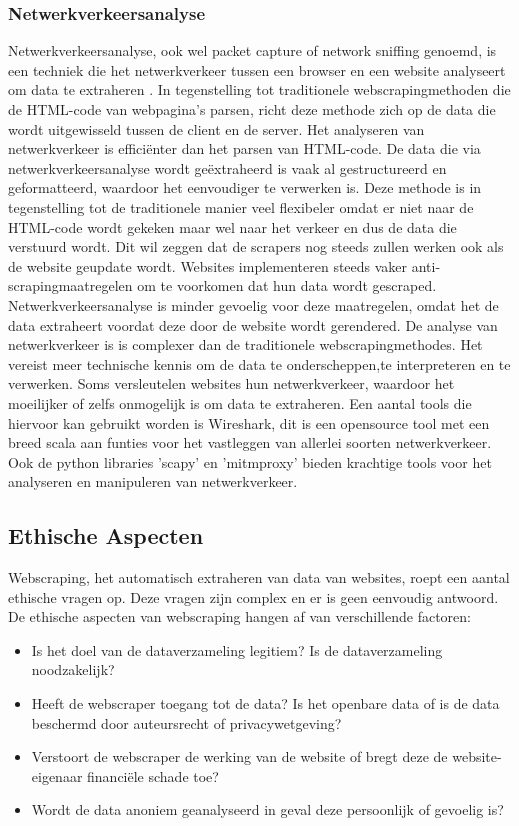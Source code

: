 \subsubsection{Netwerkverkeersanalyse}
\label{sec:Netwerkverkeersanalyse}
Netwerkverkeersanalyse, ook wel packet capture of network sniffing genoemd, is een techniek die het netwerkverkeer tussen een browser en een website analyseert om data te extraheren \autocite{Robles2020}. 
In tegenstelling tot traditionele webscrapingmethoden die de HTML-code van webpagina's parsen, richt deze methode zich op de data die wordt uitgewisseld tussen de client en de server.
Het analyseren van netwerkverkeer is efficiënter dan het parsen van HTML-code. De data die via netwerkverkeersanalyse wordt geëxtraheerd is vaak al gestructureerd en geformatteerd, 
waardoor het eenvoudiger te verwerken is. Deze methode is in tegenstelling tot de traditionele manier veel flexibeler omdat er niet naar de HTML-code wordt gekeken maar wel naar het verkeer
en dus de data die verstuurd wordt. Dit wil zeggen dat de scrapers nog steeds zullen werken ook als de website geupdate wordt. Websites implementeren steeds vaker anti-scrapingmaatregelen om 
te voorkomen dat hun data wordt gescraped. Netwerkverkeersanalyse is minder gevoelig voor deze maatregelen, omdat het de data extraheert voordat deze door de website wordt gerendered.
De analyse van netwerkverkeer is is complexer dan de traditionele webscrapingmethodes. Het vereist meer technische kennis om de data te onderscheppen,te interpreteren en te verwerken. Soms 
versleutelen websites hun netwerkverkeer, waardoor het moeilijker of zelfs onmogelijk is om data te extraheren. Een aantal tools die hiervoor kan gebruikt worden is Wireshark, dit is een
opensource tool met een breed scala aan funties voor het vastleggen van allerlei soorten netwerkverkeer. Ook de python libraries 'scapy' en 'mitmproxy' bieden krachtige tools voor het analyseren
en manipuleren van netwerkverkeer.

\subsection{Ethische Aspecten}
\label{sec:Ethische Aspecten}
Webscraping, het automatisch extraheren van data van websites, roept een aantal ethische vragen op. Deze vragen zijn complex en er is geen eenvoudig antwoord. De ethische aspecten van webscraping
hangen af van verschillende factoren:

\begin{itemize}
  \item Is het doel van de dataverzameling legitiem? Is de dataverzameling noodzakelijk?
  \item Heeft de webscraper toegang tot de data? Is het openbare data of is de data beschermd door auteursrecht of privacywetgeving?
  \item Verstoort de webscraper de werking van de website of bregt deze de website-eigenaar financiële schade toe? 
  \item Wordt de data anoniem geanalyseerd in geval deze persoonlijk of gevoelig is?
\end{itemize}

